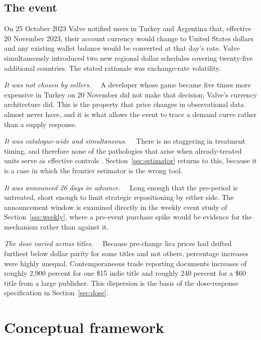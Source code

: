 \documentclass[11pt]{article}
\newcommand{\heading}[1]{\vspace{3pt}\noindent\textit{#1}\ \ }
\begin{document}
\subsection{The event}

On 25 October 2023 Valve notified users in Turkey and Argentina that, effective 20 November 2023,
their account currency would change to United States dollars and any existing wallet balance would
be converted at that day's rate. Valve simultaneously introduced two new regional dollar
schedules covering twenty-five additional countries. The stated rationale was exchange-rate
volatility.

\heading{It was not chosen by sellers.} A developer whose game became five times more expensive in
Turkey on 20 November did not make that decision; Valve's currency architecture did. This is the
property that price changes in observational data almost never have, and it is what allows the
event to trace a demand curve rather than a supply response.

\heading{It was catalogue-wide and simultaneous.} There is no staggering in treatment timing, and
therefore none of the pathologies that arise when already-treated units serve as effective
controls \citep{goodmanbacon2021}. Section~\ref{sec:estimator} returns to this, because it is a
case in which the frontier estimator is the wrong tool.

\heading{It was announced 26 days in advance.} Long enough that the pre-period is
untreated, short enough to limit strategic repositioning by either side. The announcement
window is examined directly in the weekly event study of Section~\ref{sec:weekly}, where a
pre-event purchase spike would be evidence for the mechanism rather than against it.

\heading{The dose varied across titles.} Because pre-change lira prices had drifted furthest below
dollar parity for some titles and not others, percentage increases were highly unequal.
Contemporaneous trade reporting documents increases of roughly 2{,}900 percent for one \$15 indie
title and roughly 240 percent for a \$60 title from a large publisher. This dispersion is the
basis of the dose-response specification in Section~\ref{sec:dose}.

\section{Conceptual framework}\label{sec:concept}
\end{document}
